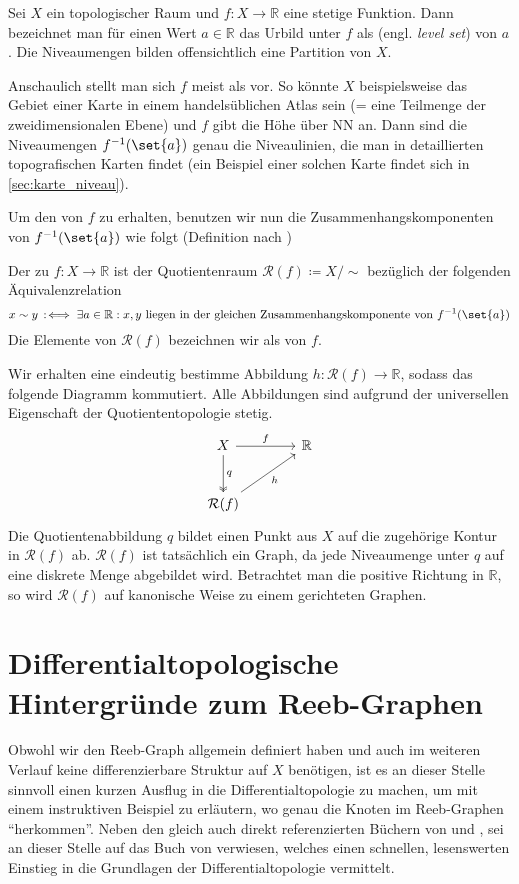 Sei $X$ ein topologischer Raum und $f \colon X \to \mathbb{R}$ eine stetige Funktion.
Dann bezeichnet man für einen Wert $a \in \mathbb{R}$ das Urbild unter $f$ als  (engl. \emph{level set}) von $a$.
Die Niveaumengen bilden offensichtlich eine Partition von $X$.

Anschaulich stellt man sich $f$ meist als  vor. 
So könnte $X$ beispielsweise das Gebiet einer Karte in einem handelsüblichen Atlas sein (= eine Teilmenge der zweidimensionalen Ebene) und $f$ gibt die Höhe über NN an.
Dann sind die Niveaumengen $f^{-1}(\set{a})$ genau die Niveaulinien, die man in detaillierten topografischen Karten findet (ein Beispiel einer solchen Karte findet sich in \cref{sec:karte_niveau}).

Um den  von $f$ zu erhalten, benutzen wir nun die Zusammenhangskomponenten von $f^{-1}(\set{a})$ wie folgt (Definition nach \textcite[.4]{compTopo})

\begin{definition}[{name=[Reeb-Graph]}]
	Der  zu $f \colon X \to \mathbb{R}$ ist der Quotientenraum $\mathcal{R}(f) \coloneqq X/{\sim}$ bezüglich der folgenden Äquivalenzrelation
	\[
		x \sim y \,:\mkern-3mu\iff \exists a \in \mathbb{R} : x,y \text{ liegen in der gleichen Zusammenhangskomponente von } f^{-1}(\set{a}) 
	\]
	Die Elemente von $\mathcal{R}(f)$ bezeichnen wir als  von $f$.
\end{definition}
Wir erhalten eine eindeutig bestimme Abbildung $h \colon \mathcal{R}(f) \to \mathbb{R}$, sodass das folgende Diagramm kommutiert.
Alle Abbildungen sind aufgrund der universellen Eigenschaft der Quotiententopologie stetig.
\[
	\begin{tikzcd}[sep=large]
		X \rar["f"] \dar["q",two heads] & \mathbb{R} \\
		\mathcal{R}(f) \urar["h"']
	\end{tikzcd}
\]
Die Quotientenabbildung $q$ bildet einen Punkt aus $X$ auf die zugehörige Kontur in $\mathcal{R}(f)$ ab.
$\mathcal{R}(f)$ ist tatsächlich ein Graph, da jede Niveaumenge unter $q$ auf eine diskrete Menge abgebildet wird.
Betrachtet man die positive Richtung in $\mathbb{R}$, so wird $\mathcal{R}(f)$ auf kanonische Weise zu einem gerichteten Graphen.

\section{Differentialtopologische Hintergründe zum Reeb-Graphen} %
\label{sec:background_reeb}
Obwohl wir den Reeb-Graph allgemein definiert haben und auch im weiteren Verlauf keine differenzierbare Struktur auf $X$ benötigen, ist es an dieser Stelle sinnvoll einen kurzen Ausflug in die Differentialtopologie zu machen, um mit einem instruktiven Beispiel zu erläutern, wo genau die Knoten im Reeb-Graphen \enquote{herkommen}.
Neben den gleich auch direkt referenzierten Büchern von \textcite{compTopo} und \textcite{MilnorMorse}, sei an dieser Stelle auf das Buch  von \textcite{Miln} verwiesen, welches einen schnellen, lesenswerten Einstieg in die Grundlagen der Differentialtopologie vermittelt.

